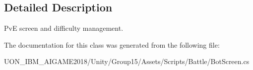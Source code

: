 \subsection{Detailed Description}
PvE screen and difficulty management. 

The documentation for this class was generated from the following file\+:\begin{DoxyCompactItemize}
\item 
U\+O\+N\+\_\+\+I\+B\+M\+\_\+\+A\+I\+G\+A\+M\+E2018/\+Unity/\+Group15/\+Assets/\+Scripts/\+Battle/Bot\+Screen.\+cs\end{DoxyCompactItemize}
